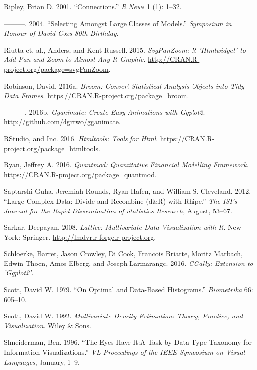 \documentclass[12pt,]{isuthesis}
\begin{document}
\hypertarget{ref-Connections}{}
Ripley, Brian D. 2001. ``Connections.'' \emph{R News} 1 (1): 1--32.

\hypertarget{ref-Ripley:2004}{}
---------. 2004. ``Selecting Amongst Large Classes of Models.''
\emph{Symposium in Honour of David Coxs 80th Birthday}.

\hypertarget{ref-svgPanZoom}{}
Riutta et. al., Anders, and Kent Russell. 2015. \emph{SvgPanZoom: R
'Htmlwidget' to Add Pan and Zoom to Almost Any R Graphic}.
\url{http://CRAN.R-project.org/package=svgPanZoom}.

\hypertarget{ref-broom}{}
Robinson, David. 2016a. \emph{Broom: Convert Statistical Analysis
Objects into Tidy Data Frames}.
\url{https://CRAN.R-project.org/package=broom}.

\hypertarget{ref-gganimate}{}
---------. 2016b. \emph{Gganimate: Create Easy Animations with Ggplot2}.
\url{http://github.com/dgrtwo/gganimate}.

\hypertarget{ref-htmltools}{}
RStudio, and Inc. 2016. \emph{Htmltools: Tools for Html}.
\url{https://CRAN.R-project.org/package=htmltools}.

\hypertarget{ref-quantmod}{}
Ryan, Jeffrey A. 2016. \emph{Quantmod: Quantitative Financial Modelling
Framework}. \url{https://CRAN.R-project.org/package=quantmod}.

\hypertarget{ref-RHIPE}{}
Saptarshi Guha, Jeremiah Rounds, Ryan Hafen, and William S. Cleveland.
2012. ``Large Complex Data: Divide and Recombine (d\&R) with Rhipe.''
\emph{The ISI's Journal for the Rapid Dissemination of Statistics
Research}, August, 53--67.

\hypertarget{ref-lattice}{}
Sarkar, Deepayan. 2008. \emph{Lattice: Multivariate Data Visualization
with R}. New York: Springer. \url{http://lmdvr.r-forge.r-project.org}.

\hypertarget{ref-GGally}{}
Schloerke, Barret, Jason Crowley, Di Cook, Francois Briatte, Moritz
Marbach, Edwin Thoen, Amos Elberg, and Joseph Larmarange. 2016.
\emph{GGally: Extension to 'Ggplot2'}.

\hypertarget{ref-hist-scott}{}
Scott, David W. 1979. ``On Optimal and Data-Based Histograms.''
\emph{Biometrika} 66: 605--10.

\hypertarget{ref-mde}{}
Scott, David W. 1992. \emph{Multivariate Density Estimation: Theory,
Practice, and Visualization}. Wiley \& Sons.

\hypertarget{ref-details-on-demand}{}
Shneiderman, Ben. 1996. ``The Eyes Have It:A Task by Data Type Taxonomy
for Information Visualizations.'' \emph{VL Proceedings of the IEEE
Symposium on Visual Languages}, January, 1--9.
\end{document}
